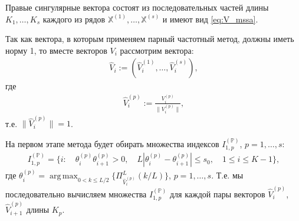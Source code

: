 \documentclass[specialist,
               substylefile = spbu.rtx,
               subf,href,colorlinks=true, 12pt]{disser}
\def\argmax{\mathop{\mathrm{argmax}}}
\def\argmax{\mathop{\mathrm{arg\,max}}}
\begin{document}
Правые сингулярные вектора
состоят из последовательных частей длины $K_1,\ldots,K_s$ каждого из рядов $\mathbb{X}^{(1)}, \ldots, \mathbb{X}^{(s)}$ и имеют вид \eqref{eq:V_mssa}.

Так как вектора, в которым применяем парный частотный метод, должны иметь норму 1, то вместе векторов $V_i$ рассмотрим вектора: 
\begin{gather*}
\widehat{V}_{i} := \left(\widehat{V}_i^{(1)}, \ldots, \widehat{V}_i^{(s)}\right),
\end{gather*}
где
\begin{gather*} \label{eq:V_norm_mssa}
\widehat{V}_i^{(p)} := \frac{V_i^{(p)}}{\|V_i^{(p)} \|},
\end{gather*}
т.е. $\| \widehat{V}_i^{(p)} \| = 1$. 

%

На первом этапе метода будет обирать множества индексов $I_{1,p}^{(\mathbb{P})}$, $p=1,\ldots,s$:
\begin{gather} \label{eq:I_1_P_mssa}
I_{1,p}^{(\mathbb{P})} = \{ i: \quad \theta_{i}^{(p)} \theta_{i+1} ^{(p)} >0, \quad L |\theta_i^{(p)} - \theta_{i+1}^{(p)}| \leqslant s_0, \quad 1 \leqslant i \leqslant K -1  \},
\end{gather}
где $\theta_i^{(p)} = \argmax_{0 < k \leqslant L/2} \{\Pi_{\widehat{V}_i^{(p)}}^L(k/L)\}$, $p=1,\ldots,s$.
Т.е. 
мы последовательно вычисляем множества $I_{1,p}^{(\mathbb{P})}$ для каждой пары векторов  $\widehat{V}_i^{(p)}$, $\widehat{V}_{i+1}^{(p)}$ длины $K_p$.
\end{document}
